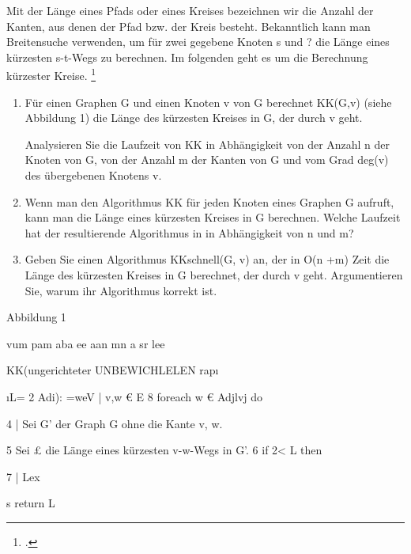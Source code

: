 \documentclass{bschlangaul-aufgabe}
\begin{document}

Mit der Länge eines Pfads oder eines Kreises bezeichnen wir die Anzahl
der Kanten, aus denen der Pfad bzw. der Kreis besteht. Bekanntlich kann
man Breitensuche verwenden, um für zwei gegebene Knoten s und ? die
Länge eines kürzesten s-t-Wegs zu berechnen. Im folgenden geht es um die
Berechnung kürzester Kreise.
\footcite{examen:66115:2012:03}

\begin{enumerate}


\item Für einen Graphen G und einen Knoten v von G berechnet KK(G,v)
(siehe Abbildung 1) die Länge des kürzesten Kreises in G, der durch v
geht.

Analysieren Sie die Laufzeit von KK in Abhängigkeit von der Anzahl n der
Knoten von G, von der Anzahl m der Kanten von G und vom Grad deg(v) des
übergebenen Knotens v.


\item Wenn man den Algorithmus KK für jeden Knoten eines Graphen G
aufruft, kann man die Länge eines kürzesten Kreises in G berechnen.
Welche Laufzeit hat der resultierende Algorithmus in in Abhängigkeit von
n und m?


\item Geben Sie einen Algorithmus KKschnell(G, v) an, der in O(n +m)
Zeit die Länge des kürzesten Kreises in G berechnet, der durch v geht.
Argumentieren Sie, warum ihr Algorithmus korrekt ist.
\end{enumerate}

Abbildung 1

vum pam aba ee aan mn a sr lee

KK(ungerichteter UNBEWICHLELEN rapı

ıL=
2 Adi): ={weV | {v,w} € E}
8 foreach w € Adjlvj do

4 | Sei G’ der Graph G ohne die Kante {v, w}.

5 Sei £ die Länge eines kürzesten v-w-Wegs in G’.
6 if 2< L then

7 | Lex

s return L
\end{document}
